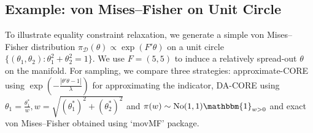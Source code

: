 \documentclass[10pt,fleqn]{article}
\newcommand{\mc}[1]{\mathcal{#1}}
\DeclareMathOperator{\No}{No}
\DeclareMathOperator{\1}{\mathbbm{1}}
\begin{document}
\subsection{Example: von Mises--Fisher on Unit Circle}
To illustrate equality constraint relaxation, we generate a simple von Mises--Fisher distribution $\pi_{\mc D}(\theta) \propto \exp(F'\theta)$ on a unit circle $\{(\theta_1,\theta_2):\theta_1^2+\theta_2^2=1\}$. We use $F=(5,5)$ to induce a relatively spread-out  $\theta$ on the manifold.
For sampling,
we compare three strategies: approximate-CORE using $\exp(-\frac{|\theta'\theta -1|}{\lambda})$ for approximating the indicator, DA-CORE
using $\theta_1 = \frac{\theta_1^*}{w}, w= \sqrt{(\theta_1^*)^2+ (\theta_2^*)^2}$ and $\pi(w)\sim \No(1,1)\mathbbm{1}_{w>0}$ and  exact  von Mises--Fisher obtained using `movMF' package.
\end{document}
